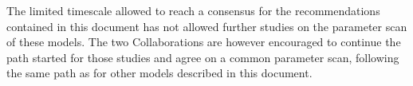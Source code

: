 The limited timescale allowed to reach a consensus for
the recommendations contained in this document has not allowed further studies on the 
parameter scan of these models. The two Collaborations are however encouraged
to continue the path started for those studies and agree on a common parameter scan,
following the same path as for other models described in this document.  

%
%
%
%
%
